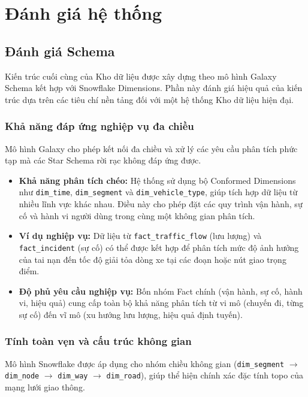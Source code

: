 \section{Đánh giá hệ thống}
\subsection{Đánh giá Schema}
Kiến trúc cuối cùng của Kho dữ liệu được xây dựng theo mô hình Galaxy Schema kết hợp với Snowflake Dimensions. Phần này đánh giá hiệu quả của kiến trúc dựa trên các tiêu chí nền tảng đối với một hệ thống Kho dữ liệu hiện đại.

\subsubsection{Khả năng đáp ứng nghiệp vụ đa chiều}
Mô hình Galaxy cho phép kết nối đa chiều và xử lý các yêu cầu phân tích phức tạp mà các Star Schema rời rạc không đáp ứng được.

\begin{itemize}
    \item \textbf{Khả năng phân tích chéo:} Hệ thống sử dụng bộ Conformed Dimensions như \texttt{dim\_time}, \texttt{dim\_segment} và \texttt{dim\_vehicle\_type}, giúp tích hợp dữ liệu từ nhiều lĩnh vực khác nhau. Điều này cho phép đặt các quy trình vận hành, sự cố và hành vi người dùng trong cùng một không gian phân tích.
    
    \item \textbf{Ví dụ nghiệp vụ:} Dữ liệu từ \texttt{fact\_traffic\_flow} (lưu lượng) và \texttt{fact\_incident} (sự cố) có thể được kết hợp để phân tích mức độ ảnh hưởng của tai nạn đến tốc độ giải tỏa dòng xe tại các đoạn hoặc nút giao trọng điểm.
    
    \item \textbf{Độ phủ yêu cầu nghiệp vụ:} Bốn nhóm Fact chính (vận hành, sự cố, hành vi, hiệu quả) cung cấp toàn bộ khả năng phân tích từ vi mô (chuyến đi, từng sự cố) đến vĩ mô (xu hướng lưu lượng, hiệu quả định tuyến).
\end{itemize}

\subsubsection{Tính toàn vẹn và cấu trúc không gian}
Mô hình Snowflake được áp dụng cho nhóm chiều không gian (\texttt{dim\_segment} $\rightarrow$ \texttt{dim\_node} $\rightarrow$ \texttt{dim\_way} $\rightarrow$ \texttt{dim\_road}), giúp thể hiện chính xác đặc tính topo của mạng lưới giao thông.

